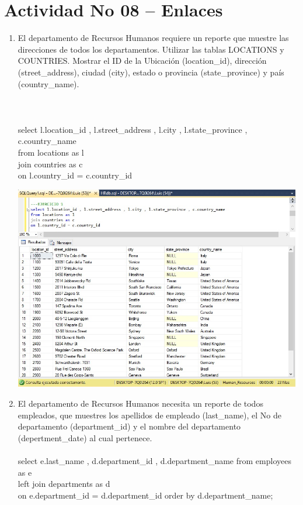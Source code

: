 \section{Actividad No 08 – Enlaces} 
		
\begin{enumerate}[1.]
	\item El departamento de Recursos Humanos requiere un reporte que muestre las direcciones de todos los departamentos. Utilizar las tablas LOCATIONS y COUNTRIES. Mostrar el ID de la Ubicación (location\_id), dirección (street\_address), ciudad (city), estado o provincia (state\_province) y país (country\_name). 
	\\
	\\%
	\\
	\\select l.location\_id , l.street\_address , l.city , l.state\_province , c.country\_name 
	\\from locations as l 
	\\join countries as c 
	\\on l.country\_id = c.country\_id

	\begin{center}
	\includegraphics[width=17cm]{./Imagenes/8ejer1} 
	\end{center}


	\item El departamento de Recursos Humanos necesita un reporte de todos empleados, que muestres los apellidos de empleado (last\_name), el No de departamento (department\_id) y el nombre del departamento (depertment\_date) al cual pertenece. 
	\\
	\\select e.last\_name , d.department\_id , d.department\_name from employees as e
	\\left join departments as d 
	\\on e.department\_id = d.department\_id order by d.department\_name;


\end{enumerate}
